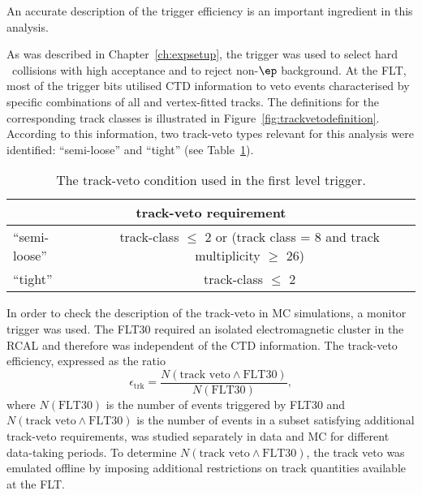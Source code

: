 An accurate description of the trigger efficiency is an important ingredient in this analysis.

As was described in Chapter~\ref{ch:expsetup}, the \zeus trigger was used to select hard \ep~collisions with high acceptance and to reject non-$\ep$ background. At the FLT, most of the trigger bits utilised CTD information to veto events characterised by specific combinations of all and vertex-fitted tracks. The definitions for the corresponding track classes is illustrated in Figure~\ref{fig:trackvetodefinition}. According to this information, two track-veto types relevant for this analysis were identified: ``semi-loose'' and ``tight'' (see Table~\ref{tab:trackveto}). 
\textcolor{blue}{
\begin{table}[htpb]
 \centering
 \begin{tabular}{lc}
 \multicolumn{2}{c}{track-veto requirement} \\
  \hline
 ``semi-loose'' & track-class $\le$ 2 or (track class = 8 and track multiplicity $\ge$ 26) \\
 ``tight''      & track-class $\le$ 2 \\
 \end{tabular} 
\caption{The track-veto condition used in the first level trigger.}
\label{tab:trackveto}
\end{table} 
}
In order to check the description of the track-veto in MC simulations, a monitor trigger was used. The FLT30 required an isolated electromagnetic cluster in the RCAL and therefore was independent of the CTD information. The track-veto efficiency, expressed as the ratio
\begin{equation}
 \epsilon_\mathrm{trk} = \frac{N\left(\text{track veto} \wedge \text{FLT30}\right)}{N\left(\text{FLT30}\right)},
\end{equation}
where $N\left(\text{FLT30}\right)$ is the number of events triggered by FLT30 and $N\left(\text{track veto} \wedge \text{FLT30}\right)$ is the number of events in a subset satisfying additional track-veto requirements, was studied separately in data and MC for different data-taking periods. To determine $N\left(\text{track veto} \wedge \text{FLT30}\right)$, the track veto was emulated offline by imposing additional restrictions on track quantities available at the FLT.

